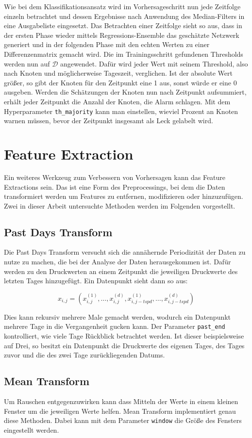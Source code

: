 Wie bei dem Klassifikationsansatz wird im Vorhersageschritt nun jede Zeitfolge einzeln betrachtet und dessen
 Ergebnisse nach Anwendung des Median-Filters in eine Ausgabeliste eingesetzt. Das Betrachten einer Zeitfolge
 sieht so aus, dass in der ersten Phase wieder mittels Regressions-Ensemble das geschätzte Netzwerk generiert
 und in der folgenden Phase mit den echten Werten zu einer Differenzenmatrix gemacht wird. Die im Trainingsschritt
 gefundenen Thresholds werden nun auf $\mathcal{D}$ angewendet. Dafür wird jeder Wert mit seinem Threshold,
 also nach Knoten und möglicherweise Tageszeit, verglichen. Ist der absolute Wert größer, so gibt der Knoten für
 den Zeitpunkt eine 1 aus, sonst würde er eine 0 ausgeben. Werden die Schätzungen der Knoten nun nach Zeitpunkt
 aufsummiert, erhält jeder Zeitpunkt die Anzahl der Knoten, die Alarm schlagen. Mit dem Hyperparameter
 \texttt{th\_majority} kann man einstellen, wieviel Prozent an Knoten warnen müssen, bevor der Zeitpunkt insgesamt
 als Leck gelabelt wird.

\section{Feature Extraction}

Ein weiteres Werkzeug zum Verbessern von Vorhersagen kann das Feature Extractions sein. Das ist eine Form des
 Preprocessings, bei dem die Daten transformiert werden um Features zu entfernen, modifizieren oder hinzuzufügen.
 Zwei in dieser Arbeit untersuchte Methoden werden im Folgenden vorgestellt.

\subsection*{Past Days Transform}

Die Past Days Transform versucht sich die annähernde Periodizität der Daten zu nutze zu machen, die bei
der Analyse der Daten herausgekommen ist. Dafür werden zu den Druckwerten an einem Zeitpunkt die jeweiligen
Druckwerte des letzten Tages hinzugefügt. Ein Datenpunkt sieht dann so aus:

\begin{equation*}
    x_{i, j} = (x_{i, j}^{(1)}, \dots, x_{i, j}^{(d)}, x_{i, j-tspd}^{(1)}, \dots, x_{i, j-tspd}^{(d)})
\end{equation*}

Dies kann rekursiv mehrere Male gemacht werden, wodurch ein Datenpunkt mehrere Tage in die Vergangenheit
 gucken kann. Der Parameter \texttt{past\_end} kontrolliert, wie viele Tage Rückblick betrachtet werden. Ist
 dieser beispielsweise auf Drei, so besitzt ein Datenpunkt die Druckwerte des eigenen Tages, des Tages
 zuvor und die des zwei Tage zurückliegenden Datums.

\subsection*{Mean Transform}

Um Rauschen entgegenzuwirken kann dass Mitteln der Werte in einem kleinen Fenster um die jeweiligen Werte helfen.
 Mean Transform implementiert genau diese Methoden. Dabei kann mit dem Parameter \texttt{window} die Größe des
 Fensters eingestellt werden.
